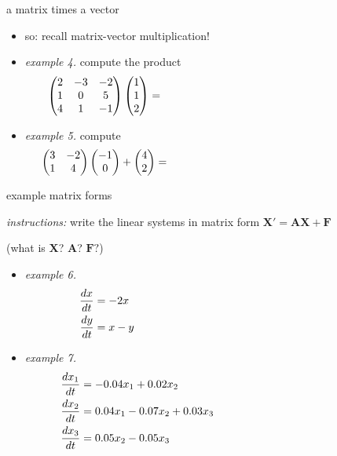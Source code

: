 \documentclass[dvipsnames,colorlinks]{beamer}
\newcommand{\bA}{\mathbf{A}}
\newcommand{\bF}{\mathbf{F}}
\newcommand{\bX}{\mathbf{X}}
\begin{document}
\begin{frame}{a matrix times a vector}

\begin{itemize}
\item so: \alert{recall matrix-vector multiplication!}
\item \emph{example 4.}  compute the product
    $$\begin{pmatrix} 2 & -3 & -2 \\ 1 & 0 & 5 \\ 4 & 1 & -1\end{pmatrix} \begin{pmatrix} 1 \\ 1 \\ 2 \end{pmatrix} = \hspace{70mm}$$

\vspace{15mm}
\item \emph{example 5.}  compute
    $$\begin{pmatrix} 3 & -2 \\ 1 & 4 \end{pmatrix} \begin{pmatrix} -1 \\ 0 \end{pmatrix} +  \begin{pmatrix} 4 \\ 2 \end{pmatrix} = \hspace{70mm}$$
\end{itemize}

\vspace{15mm}
\end{frame}


\begin{frame}{example matrix forms}

\small
\noindent \emph{instructions:} write the linear systems in matrix form $\bX' = \bA\bX + \bF$

(what is $\bX$? $\bA$? $\bF?$)
\begin{itemize}
\item \emph{example 6.}
\begin{align*}
\frac{dx}{dt} &= - 2 x \hspace{70mm} \\
\frac{dy}{dt} &= x - y
\end{align*}
\item \emph{example 7.}
\begin{align*}
\frac{dx_1}{dt} &= -0.04 x_1 + 0.02 x_2 \hspace{60mm} \\
\frac{dx_2}{dt} &= 0.04 x_1 - 0.07 x_2 + 0.03 x_3 \\
\frac{dx_3}{dt} &= 0.05 x_2 - 0.05 x_3
\end{align*}
\end{itemize}
\end{frame}
\end{document}
